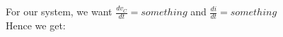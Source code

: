 \documentclass[preview]{standalone}
\begin{document}
\begin{center}
\raggedright
                For our system, we want $\frac{dv_C}{dt} = something$ and $\frac{di}{dt} = something$ \\
                Hence we get:
\end{center}
\end{document}
